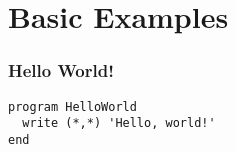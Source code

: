 \documentclass[xcolor=dvipsnames,dvip,notes=show,table]{beamer}
\begin{document}
% 
% 
% 
% 
% 
% 
% 
% 
% 
%      
%   
% 
% 
% 
% 
% 
% 
% 
% 
% 
% 


\section{Basic Examples}

\begin{frame}[fragile]
\frametitle{Hello World!}

\begin{lstlisting}
program HelloWorld
  write (*,*) 'Hello, world!' 
end
\end{lstlisting}
\end{frame}
% 
\end{document}
